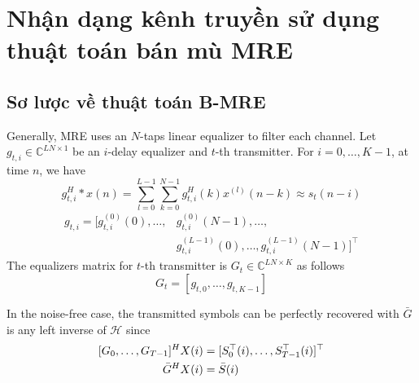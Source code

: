 \clearpage
{}

\setcounter{chapter}{1}
\chapter[{NHẬN DẠNG KÊNH TRUYỀN SỬ DỤNG THUẬT TOÁN BÁN MÙ MRE}]{Nhận dạng kênh truyền sử dụng thuật toán bán mù MRE}

\section{Sơ lược về thuật toán B-MRE}

Generally, MRE uses an $N$-taps linear equalizer to filter each channel. Let $g_{t, i}  \in \mathbb{C}^{LN \times 1}$ be an $i$-delay equalizer and $t$-th transmitter. For \mbox{$i=0, \ldots, K-1$}, at time $n$, we have
\begin{equation}
    g^H_{t, i} * x(n)=\sum_{l=0}^{L-1}\sum_{k=0}^{N-1} g^H_{t,i}(k) x^{(l)}(n-k) \approx s_t(n-i)
\end{equation}
\begin{equation}
\begin{aligned}
    g_{t,i}=\big[g_{t, i}^{(0)}(0), \ldots, &g_{t, i}^{(0)}(N - 1), \ldots, \\
    &g_{t, i}^{(L-1)}(0), \ldots, g_{t, i}^{(L-1)} (N-1) \big]^\top
\end{aligned}
\end{equation}
The equalizers matrix for $t$-th transmitter is $G_t \in \mathbb{C}^{LN \times K}$ as follows
\begin{equation}
    G_t = [g_{t, 0}, \ldots, g_{t, K-1}]
\end{equation}

In the noise-free case, the transmitted symbols can be perfectly recovered with $\bar{G}$ is any left inverse of $\mathcal{H}$ since
\begin{equation}
    \begin{aligned}
        \relax[G_0, \ldots, G_{T-1}]^{H} 
        X(i)
        &= [S_0^\top(i), \ldots, S^\top_{T-1}(i)]^\top \\
        \bar{G}^H X(i) &= \bar{S}(i)
    \end{aligned}   
\end{equation}

